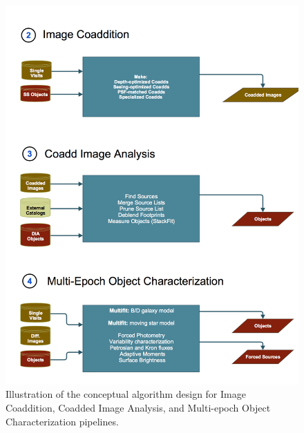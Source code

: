 \documentclass[SE,lsstdraft,toc]{lsstdoc}
\begin{document}
\begin{figure}[!th]
    \centering
    \vskip -0.2in
    \includegraphics[scale=0.535]{gliffy/CoaddedImageProcessing}
    \vskip -0.2in
    \caption{Illustration of the conceptual algorithm design for Image Coaddition, Coadded Image Analysis,
     and Multi-epoch Object Characterization pipelines.\label{fig:Pipes234}}
\end{figure}
\end{document}
